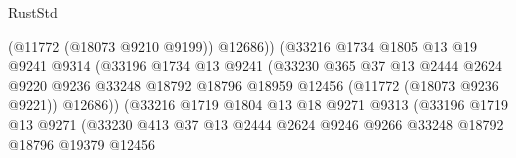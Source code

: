 \begin{lexlean}{RustStd}
\begin{coremodule}
                                          (@11772 (@18073 @9210 @9199))
                                          @12686))
                                      (@33216
                                        @1734
                                        @1805
                                        @13
                                        @19
                                        @9241
                                        @9314
                                        (@33196
                                          @1734
                                          @13
                                          @9241
                                          (@33230
                                            @365
                                            @37
                                            @13
                                            @2444
                                            @2624
                                            @9220
                                            @9236
                                            @33248
                                            @18792
                                            @18796
                                            @18959
                                            @12456
                                            (@11772 (@18073 @9236 @9221))
                                            @12686))
                                        (@33216
                                          @1719
                                          @1804
                                          @13
                                          @18
                                          @9271
                                          @9313
                                          (@33196
                                            @1719
                                            @13
                                            @9271
                                            (@33230
                                              @413
                                              @37
                                              @13
                                              @2444
                                              @2624
                                              @9246
                                              @9266
                                              @33248
                                              @18792
                                              @18796
                                              @19379
                                              @12456

\end{coremodule}
\end{lexlean}

